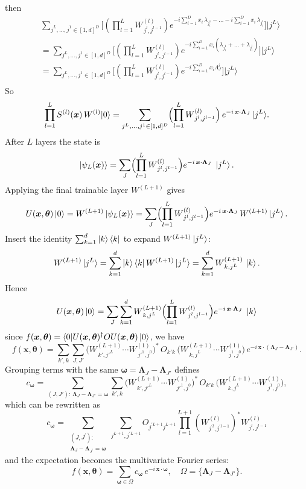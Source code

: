 \documentclass[%
 reprint,
 amsmath,amssymb,
 aps,
 pra,
]{revtex4-2}
\theoremstyle{definition}
\begin{document}
then
$$
\begin{aligned}
&\sum_{j^L,\dots,j^1\in[1,d]^D}
\biggl[(\prod_{l=1}^L W^{(l)}_{\,j^l,j^{l-1}})
e^{-i\sum_{i=1}^D x_i\,\lambda_{j^1_i}-\ldots-i\sum_{i=1}^D x_i\,\lambda_{j_i^l}}
\biggr]
\lvert j^L\rangle\\
&=\sum_{j^L,\dots,j^1\in[1,d]^D}
\biggl[(\prod_{l=1}^L W^{(l)}_{\,j^l,j^{l-1}})
e^{-i\sum_{i=1}^D x_i(\lambda_{j^1_i}+\ldots+\lambda_{j_i^l})}
\biggr]
\lvert j^L\rangle\\
&=\sum_{j^L,\dots,j^1\in[1,d]^D}
\biggl[(\prod_{l=1}^L W^{(l)}_{\,j^l,j^{l-1}})
e^{-i\sum_{i=1}^D x_i\Lambda_J^i}
\biggr]
\lvert j^L\rangle\\
\end{aligned}
$$
So
\[
\prod_{l=1}^L S^{(l)}(\bm{x})\,W^{(l)}\lvert0\rangle
=\sum_{j^L,\dots,j^1\in[1,d]^D}
\Bigl(\prod_{l=1}^L W^{(l)}_{\,j^l,j^{l-1}}\Bigr)\,
e^{-i\,\bm{x}\cdot\boldsymbol\Lambda_J}\,
\lvert j^L\rangle.
\]
After \(L\) layers the state is
\[
\ket{\psi_L(\bm{x})}
=\sum_{J}
\Bigl(\prod_{l=1}^L W^{(l)}_{\,j^l,j^{l-1}}\Bigr)
e^{-i\,\bm{x}\cdot\boldsymbol\Lambda_J}
\;\ket{j^L}.
\]
Applying the final trainable layer \(W^{(L+1)}\) gives
\[
U(\bm{x},\bm{\theta})\ket{0}
=W^{(L+1)}\ket{\psi_L(\bm{x})}
=\sum_{J}
\Bigl(\prod_{l=1}^L W^{(l)}_{\,j^l,j^{l-1}}\Bigr)
e^{-i\,\bm{x}\cdot\boldsymbol\Lambda_J}
\,W^{(L+1)}\ket{j^L}.
\]
Insert the identity \(\sum_{k=1}^d\ket{k}\bra{k}\) to expand \(W^{(L+1)}\ket{j^L}\):
\[
W^{(L+1)}\ket{j^L}
=\sum_{k=1}^d\ket{k}\bra{k}W^{(L+1)}\ket{j^L}
=\sum_{k=1}^d W^{(L+1)}_{\,k,j^L}\,\ket{k}.
\]
Hence
\[
U(\bm{x},\bm{\theta})\ket{0}
=\sum_{J}\sum_{k=1}^d
W^{(L+1)}_{\,k,j^L}
\Bigl(\prod_{l=1}^L W^{(l)}_{\,j^l,j^{l-1}}\Bigr)
e^{-i\,\bm{x}\cdot\boldsymbol\Lambda_J}
\;\ket{k}
\]
since $f(\bm{x},\bm{\theta})=\langle0|U(\bm{x},\bm{\theta})^\dagger O U(\bm{x},\bm{\theta})\ket{0}$, we have
\[
f(\bm{x},\bm{\theta})
=\sum_{k',k}\sum_{J,J'}
\bigl(W^{(L+1)}_{\,k',j'^L}\cdots W^{(1)}_{\,j'^1,j^0}\bigr)^*
\,O_{k'k}\,
\bigl(W^{(L+1)}_{\,k,j^L}\cdots W^{(1)}_{\,j^1,j^0}\bigr)
\,e^{-i\,\bm{x}\cdot(\boldsymbol\Lambda_J-\boldsymbol\Lambda_{J'})}.
\]
Grouping terms with the same \(\boldsymbol\omega=\boldsymbol\Lambda_J-\boldsymbol\Lambda_{J'}\) defines
\[
c_{\boldsymbol\omega}
=\sum_{(J,J'):\,\boldsymbol\Lambda_J-\boldsymbol\Lambda_{J'}=\boldsymbol\omega}
\sum_{k',k}
\bigl(W^{(L+1)}_{\,k',j'^L}\cdots W^{(1)}_{\,j'^1,j^0}\bigr)^*
\,O_{k'k}\,
\bigl(W^{(L+1)}_{\,k,j^L}\cdots W^{(1)}_{\,j^1,j^0}\bigr),
\]
which can be rewritten as
\begin{equation}
\label{eq:QFM_coefficient}
c_{\bm{\omega}}=\sum_{\substack{\left(J, J^{\prime}\right): \\ \bm{\Lambda}_J-\bm{\Lambda}_{J^{\prime}}=\bm{\omega}}} \sum_{j^{L+1}, j^{\prime L+1}} O_{j^{\prime L+1} j^{L+1}} \prod_{l=1}^{L+1}\left(W_{j^{\prime l}, j^{\prime l-1}}^{(l)}\right)^* W_{j^l, j^{l-1}}^{(l)}
\end{equation}
and the expectation becomes the multivariate Fourier series:
\[
f(\bm{x},\bm{\theta})
=\sum_{\boldsymbol\omega\in\Omega}
c_{\boldsymbol\omega}\,
e^{-i\,\bm{x}\cdot\boldsymbol\omega},\quad
\Omega=\{\boldsymbol\Lambda_J-\boldsymbol\Lambda_{J'}\}.
\]
\end{document}
